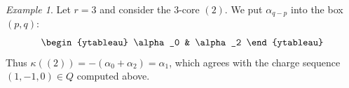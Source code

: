 \documentclass{amsart}
\newcommand{\Z}{\mathbb{Z}}
\newcommand{\Y}{\mathbb{Y}}
\newcommand{\cC}{\mathcal{C}}
\newcommand{\alb}{{\overline{\alpha}}}
\newcommand{\kb}{\kappa}
\newcommand{\mud}{{\mu^\bullet}}
\newcommand{\af}{\mathrm{af}}
\newcommand{\cl}{\mathrm{cl}}
\newcommand{\core}{\mathrm{core}}
\newcommand{\id}{\mathrm{id}}
\newcommand{\quot}{\mathrm{quot}}
\newcommand{\Sym}{\mathfrak{S}}
\newcommand{\Symaf}{\hat{\mathfrak{S}}}
\theoremstyle{remark}
\newtheorem{ex}[thm]{Example}
\numberwithin{thm}{section}
\numberwithin{equation}{section}
\begin{document}
%

\begin{ex} \label{X:roots and cores} Let $r=3$ and consider the $3$-core $(2)$. We put $\alpha_{q-p}$ into the box $(p,q)$:
\[
\begin{ytableau} \alpha_0 & \alpha_2 \end{ytableau}
\]
Thus $\kb((2))=-(\alpha_0+\alpha_2)=\alpha_1$, which agrees with the charge sequence $(1,-1,0)\in Q$ computed above.
\end{ex}


\end{document}
